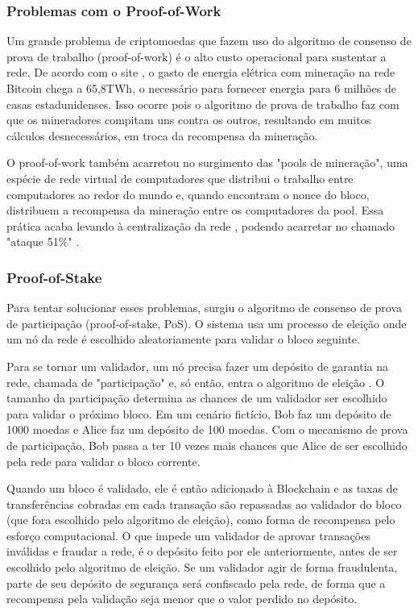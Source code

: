 \documentclass[openright]{normas-utf-tex} %
\begin{document}
\subsubsection{Problemas com o Proof-of-Work}

Um grande problema de criptomoedas que fazem uso do algoritmo de consenso de prova de trabalho (proof-of-work) é o alto custo operacional para sustentar a rede. De acordo com o site , o gasto de energia elétrica com mineração na rede Bitcoin chega a 65,8TWh, o necessário para fornecer energia para 6 milhões de casas estadunidenses. Isso ocorre pois o algoritmo de prova de trabalho faz com que os mineradores compitam uns contra os outros, resultando em muitos cálculos desnecessários, em troca da recompensa da mineração.

O proof-of-work também acarretou no surgimento das "pools de mineração", uma espécie de rede virtual de computadores que distribui o trabalho entre computadores ao redor do mundo e, quando encontram o nonce do bloco, distribuem a recompensa da mineração entre os computadores da pool. Essa prática acaba levando à centralização da rede \cite{Beikverdi2015}, podendo acarretar no chamado "ataque 51\%" \cite{Tosh2017}.

\subsubsection{Proof-of-Stake}

Para tentar solucionar esses problemas, surgiu o algoritmo de consenso de prova de participação (proof-of-stake, PoS). O sistema usa um processo de eleição onde um nó da rede é escolhido aleatoriamente para validar o bloco seguinte. 

Para se tornar um validador, um nó precisa fazer um depósito de garantia na rede, chamada de  "participação" e, só então, entra o algoritmo de eleição \cite{Tosh2017}. O tamanho da participação determina as chances de um validador ser escolhido para validar o próximo bloco. Em um cenário fictício, Bob faz um depósito de 1000 moedas e Alice faz um depósito de 100 moedas. Com o mecanismo de prova de participação, Bob passa a ter 10 vezes mais chances que Alice de ser escolhido pela rede para validar o bloco corrente.

Quando um bloco é validado, ele é então adicionado à Blockchain e as taxas de transferências cobradas em cada transação são repassadas ao validador do bloco (que fora escolhido pelo algoritmo de eleição), como forma de recompensa pelo esforço computacional. O que impede um validador de aprovar transações inválidas e fraudar a rede, é o depósito feito por ele anteriormente, antes de ser escolhido pelo algoritmo de eleição. Se um validador agir de forma fraudulenta, parte de seu depósito de segurança será confiscado pela rede, de forma que a recompensa pela validação seja menor que o valor perdido no depósito.
\end{document}
